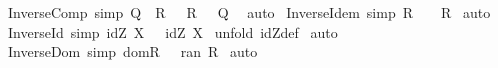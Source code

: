 \begin{isabellebody}
%
\isadelimproof
\isanewline
%
\endisadelimproof
\isanewline
{}\isamarkupfalse%
\ Inverse{\isacharunderscore}Comp\ {\isacharbrackleft}simp{\isacharbrackright}{\isacharcolon}\ {\isachardoublequoteopen}{\isacharparenleft}{\isacharparenleft}Q\ {\isacharpercent}{\isacharsemicolon}\ R{\isacharparenright}\ {\isacharpercent}{\isachartilde}{\isacharparenright}\ {\isacharequal}\ {\isacharparenleft}{\isacharparenleft}R\ {\isacharpercent}{\isachartilde}{\isacharparenright}\ {\isacharpercent}{\isacharsemicolon}\ {\isacharparenleft}Q\ {\isacharpercent}{\isachartilde}{\isacharparenright}{\isacharparenright}{\isachardoublequoteclose}\isanewline
%
\isadelimproof
%
\endisadelimproof
%
\isatagproof
{}\isamarkupfalse%
\ auto\isanewline
{}\isamarkupfalse%
%
\endisatagproof
{\isafoldproof}%
%
\isadelimproof
\isanewline
%
\endisadelimproof
\isanewline
{}\isamarkupfalse%
\ Inverse{\isacharunderscore}Idem\ {\isacharbrackleft}simp{\isacharbrackright}{\isacharcolon}\ {\isachardoublequoteopen}{\isacharparenleft}{\isacharparenleft}R\ {\isacharpercent}{\isachartilde}{\isacharparenright}\ {\isacharpercent}{\isachartilde}{\isacharparenright}\ {\isacharequal}\ R{\isachardoublequoteclose}\isanewline
%
\isadelimproof
%
\endisadelimproof
%
\isatagproof
{}\isamarkupfalse%
\ auto\isanewline
{}\isamarkupfalse%
%
\endisatagproof
{\isafoldproof}%
%
\isadelimproof
\isanewline
%
\endisadelimproof
\isanewline
{}\isamarkupfalse%
\ Inverse{\isacharunderscore}Id\ {\isacharbrackleft}simp{\isacharbrackright}{\isacharcolon}\ {\isachardoublequoteopen}{\isacharparenleft}{\isacharparenleft}idZ\ X{\isacharparenright}\ {\isacharpercent}{\isachartilde}{\isacharparenright}\ {\isacharequal}\ idZ\ X{\isachardoublequoteclose}\isanewline
%
\isadelimproof
%
\endisadelimproof
%
\isatagproof
{}\isamarkupfalse%
\ {\isacharparenleft}unfold\ idZ{\isacharunderscore}def{\isacharparenright}\isanewline
{}\isamarkupfalse%
\ auto\isanewline
{}\isamarkupfalse%
%
\endisatagproof
{\isafoldproof}%
%
\isadelimproof
\isanewline
%
\endisadelimproof
\isanewline
{}\isamarkupfalse%
\ Inverse{\isacharunderscore}Dom\ {\isacharbrackleft}simp{\isacharbrackright}{\isacharcolon}\ {\isachardoublequoteopen}dom{\isacharparenleft}R\ {\isacharpercent}{\isachartilde}{\isacharparenright}\ {\isacharequal}\ ran\ {\isacharparenleft}R{\isacharparenright}{\isachardoublequoteclose}\isanewline
%
\isadelimproof
%
\endisadelimproof
%
\isatagproof
{}\isamarkupfalse%
\ auto\isanewline

\end{isabellebody}
